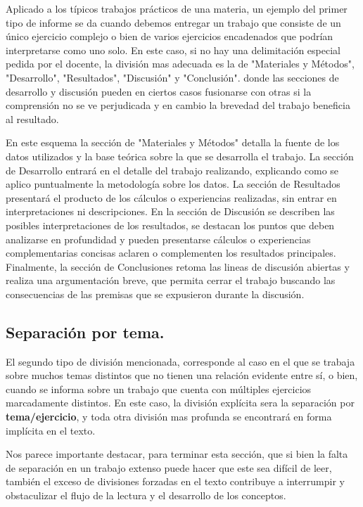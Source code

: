 \documentclass[11pt]{article}
\begin{document}
Aplicado a los típicos trabajos prácticos de una materia, un ejemplo del primer tipo de informe se da cuando
debemos entregar un trabajo que consiste de un único ejercicio complejo o bien de varios ejercicios encadenados
que podrían interpretarse como uno solo. En este caso, si no hay una delimitación especial pedida por el docente, 
la división mas adecuada es la de "Materiales y Métodos", "Desarrollo", "Resultados", "Discusión" y "Conclusión".
donde las secciones de desarrollo y discusión pueden en ciertos casos fusionarse con otras si la comprensión 
no se ve perjudicada y en cambio la brevedad del trabajo beneficia al resultado.

En este esquema la sección de "Materiales y Métodos" detalla la fuente de los datos utilizados y la base teórica
sobre la que se desarrolla el trabajo. La sección de Desarrollo entrará en el detalle del trabajo realizando, 
explicando como se aplico puntualmente la metodología sobre los datos. La sección de Resultados presentará el
producto de los cálculos o experiencias realizadas, sin entrar en interpretaciones ni descripciones. En la sección
de Discusión se describen las posibles interpretaciones de los resultados, se destacan los puntos que deben
analizarse en profundidad y pueden presentarse cálculos o experiencias complementarias concisas
aclaren o complementen los resultados principales. Finalmente, la sección de Conclusiones retoma las lineas de 
discusión abiertas y realiza una argumentación breve, que permita cerrar el trabajo buscando las consecuencias
de las premisas que se expusieron durante la discusión.

\subsection{Separación por tema.}
\label{sec-4-2}

El segundo tipo de división mencionada, corresponde al caso en el que se trabaja sobre muchos temas 
distintos que no tienen una relación evidente entre sí, o bien, cuando se informa sobre un trabajo
que cuenta con múltiples ejercicios marcadamente distintos. 
En este caso, la división explícita sera la separación por \textbf{tema/ejercicio}, y toda otra división mas profunda
se encontrará en forma implícita en el texto.

Nos parece importante destacar, para terminar esta sección, que si bien la falta de separación en un trabajo
extenso puede hacer que este sea difícil de leer, también el exceso de divisiones forzadas en el texto contribuye
a interrumpir y obstaculizar el flujo de la lectura y el desarrollo de los conceptos.
\end{document}
